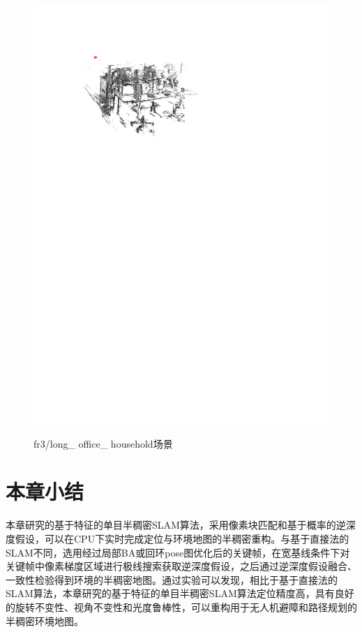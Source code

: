\begin{figure}[h]
{          \includegraphics[scale=0.8]{figures/Fig4-6_b.pdf}
          }
     \caption{fr3/long\_ office\_ household场景}
\label{fig4.6}
\end{figure}


\section{本章小结}
本章研究的基于特征的单目半稠密SLAM算法，采用像素块匹配和基于概率的逆深度假设，可以在CPU下实时完成定位与环境地图的半稠密重构。与基于直接法的SLAM不同，选用经过局部BA或回环pose图优化后的关键帧，在宽基线条件下对关键帧中像素梯度区域进行极线搜索获取逆深度假设，之后通过逆深度假设融合、一致性检验得到环境的半稠密地图。通过实验可以发现，相比于基于直接法的SLAM算法，本章研究的基于特征的单目半稠密SLAM算法定位精度高，具有良好的旋转不变性、视角不变性和光度鲁棒性，可以重构用于无人机避障和路径规划的半稠密环境地图。



